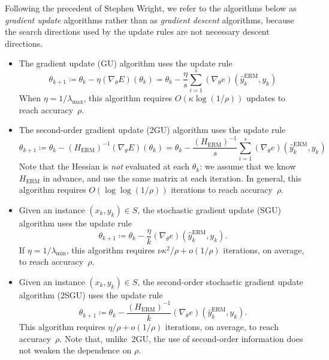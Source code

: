 \documentclass[11pt,a4paper]{article}
\numberwithin{equation}{section}
\begin{document}
Following the precedent of Stephen Wright, we refer to the algorithms below as
\emph{gradient update} algorithms rather than as \emph{gradient descent}
algorithms, because the search directions used by the update rules are not
necessary descent directions.
\begin{itemize} 
\item The gradient update (GU) algorithm uses the update rule
\[
	\theta_{k + 1}
	\coloneqq \theta_k - \eta (\nabla_\theta E)(\theta_k)
	= \theta_k - \frac{\eta}{s} \sum_{i = 1}^s
		(\nabla_\theta e)(\hat{y}_k^{\text{ERM}}, y_k)
\]
When $\eta = 1/\lambda_{\text{max}}$, this algorithm requires $O(\kappa \log(1 /
\rho))$ updates to reach accuracy~$\rho$.

\item The second-order gradient update (2GU) algorithm uses the update rule
\[
	\theta_{k + 1}
	\coloneqq \theta_k - (H_{\text{ERM}})^{-1} (\nabla_\theta E)(\theta_k)
	= \theta_k - \frac{(H_{\text{ERM}})^{-1}}{s} \sum_{i = 1}^s
		(\nabla_\theta e)(\hat{y}_k^{\text{ERM}}, y_k)
\]
Note that the Hessian is \emph{not} evaluated at each $\theta_k$: we assume that
we know $H_{\text{ERM}}$ in advance, and use the same matrix at each iteration.
In general, this algorithm requires $O(\log\log(1 / \rho))$ iterations to reach
accuracy~$\rho$.

\item Given an instance $(x_k, y_k) \in S$, the stochastic gradient update (SGU)
algorithm uses the update rule
\[
	\theta_{k + 1}
	\coloneqq \theta_k - \frac{\eta}{k}
		(\nabla_\theta e)(\hat{y}_k^{\text{ERM}}, y_k).
\]
If $\eta = 1/\lambda_{\text{min}}$, this algorithm requires $\nu \kappa^2 / \rho
+ o(1 / \rho)$ iterations, on average, to reach accuracy~$\rho$.

\item Given an instance $(x_k, y_k) \in S$, the second-order stochastic gradient
update algorithm (2SGU) uses the update rule
\[
	\theta_{k + 1}
	\coloneqq \theta_k - \frac{(H_{\text{ERM}})^{-1}}{k}
		(\nabla_\theta e)(\hat{y}_k^{\text{ERM}}, y_k).
\]
This algorithm requires $\eta / \rho + o(1 / \rho)$ iterations, on average, to
reach accuracy~$\rho$. Note that, unlike~2GU, the use of second-order
information does not weaken the dependence on $\rho$.
\end{itemize}
\end{document}
